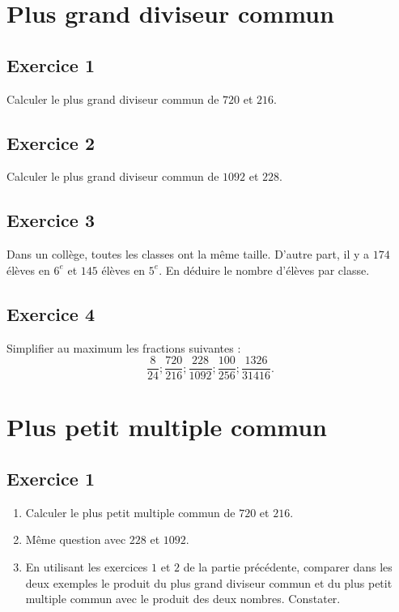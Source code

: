 \documentclass[12 pt]{article}
\theoremstyle{plain}
\newcounter{n}
\numberwithin{n}{section}
\begin{document}
\section*{Plus grand diviseur commun}

\subsection*{Exercice 1}

Calculer le plus grand diviseur commun de $720$ et $216$. 


\subsection*{Exercice 2}

Calculer le plus grand diviseur commun de $1 092$ et $228$. 


\subsection*{Exercice 3}

Dans un collège, toutes les classes ont la même taille. D'autre part, il y a $174$ élèves en $6^e$ et $145$ élèves en $5^e$. En déduire le nombre d'élèves par classe. 

\subsection*{Exercice 4}

Simplifier au maximum les fractions suivantes  : 
\[ \frac8{24} ; \frac{720}{216} ; \frac{228}{1092} ; \frac{100}{256}
; \frac{1 326}{31 416}.\]

\section*{Plus petit multiple commun}

\subsection*{Exercice 1}


\begin{enumerate}
\item Calculer le plus petit multiple commun de $720$ et $216$. 

\item Même question avec $228$ et $1 092$. 

\item En utilisant les exercices $1$ et $2$ de la partie précédente, 
comparer dans les deux exemples le produit du plus grand diviseur commun 
et du plus petit multiple commun avec le produit des deux nombres. 
Constater. 
\end{enumerate}
\end{document}
